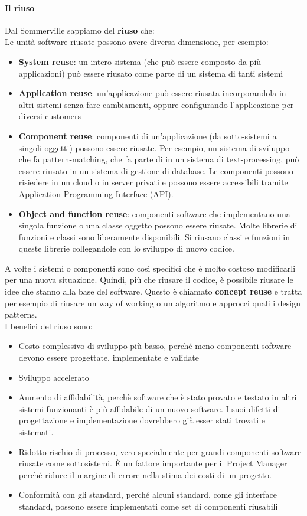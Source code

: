 			\paragraph{Il riuso}
			Dal Sommerville sappiamo del \textbf{riuso} che: \\
			Le unità software riusate possono avere diversa dimensione, per esempio:
			\begin{itemize}
				\item \textbf{System reuse}: un intero sistema (che può essere composto da più applicazioni) può essere riusato come parte di un sistema di tanti sistemi
				\item \textbf{Application reuse}: un'applicazione può essere riusata incorporandola in altri sistemi senza fare cambiamenti, oppure configurando l'applicazione per diversi customers
				\item \textbf{Component reuse}: componenti di un'applicazione (da sotto-sistemi a singoli oggetti) possono essere riusate. Per esempio, un sistema di sviluppo che fa pattern-matching, che fa parte di in un sistema di text-processing, può essere riusato in un sistema di gestione di database. Le componenti possono risiedere in un cloud o in server privati e possono essere accessibili tramite Application Programming Interface (API).
				\item \textbf{Object and function reuse}: componenti software che implementano una singola funzione o una classe oggetto possono essere riusate. Molte librerie di funzioni e classi sono liberamente disponibili. Si riusano classi e funzioni in queste librerie collegandole con lo sviluppo di nuovo codice.
			\end{itemize}
			A volte i sistemi o componenti sono così specifici che è molto costoso modificarli per una nuova situazione. Quindi, più che riusare il codice, è possibile riusare le idee che stanno alla base del software. Questo è chiamato \textbf{concept reuse} e tratta per esempio di riusare un way of working o un algoritmo e approcci quali i design patterns. \\
			I benefici del riuso sono:
			\begin{itemize}
				\item Costo complessivo di sviluppo più basso, perché meno componenti software devono essere progettate, implementate e validate
				\item Sviluppo accelerato
				\item Aumento di affidabilità, perchè software che è stato provato e testato in altri sistemi funzionanti è più affidabile di un nuovo software. I suoi difetti di progettazione e implementazione dovrebbero già esser stati trovati e sistemati.
				\item  Ridotto rischio di processo, vero specialmente per grandi componenti software riusate come sottosistemi. È un fattore importante per il Project Manager perché riduce il margine di errore nella stima dei costi di un progetto.
				\item Conformità con gli standard, perché alcuni standard, come gli interface standard, possono essere implementati come set di componenti riusabili
			\end{itemize}
